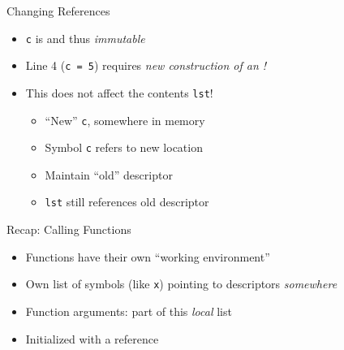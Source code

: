 
\begin{frame}{Changing References}
%
\begin{itemize}
\item \texttt{c} is  and thus \emph{immutable}
\item Line 4 (\texttt{c = 5}) requires \emph{new construction of an !}
\item This does not affect the contents \texttt{lst}!
	\begin{itemize}
	\item \enquote{New} \texttt{c}, somewhere in memory
	\item Symbol \texttt{c} refers to new location
	\item Maintain \enquote{old} descriptor
	\item \texttt{lst} still references old descriptor
	\end{itemize}
\end{itemize}
%
\end{frame}


\begin{frame}{Recap: Calling Functions}
%
\begin{itemize}
\item Functions have their own \enquote{working environment}
\item Own list of symbols (like \texttt{x}) pointing to descriptors \emph{somewhere}
\item Function arguments: part of this \emph{local} list
\item Initialized with a reference
\end{itemize}
%
\end{frame}


